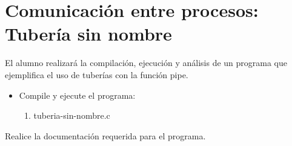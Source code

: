 \section{Comunicación entre procesos: Tubería sin nombre}

	El alumno realizará la compilación, ejecución y análisis de un programa que ejemplifica el uso de tuberías con la función pipe.

\begin{itemize}

	\item Compile y ejecute el programa:

		\begin{enumerate}

			\item tuberia-sin-nombre.c

		\end{enumerate}

\end{itemize}

	Realice la documentación requerida para el programa.